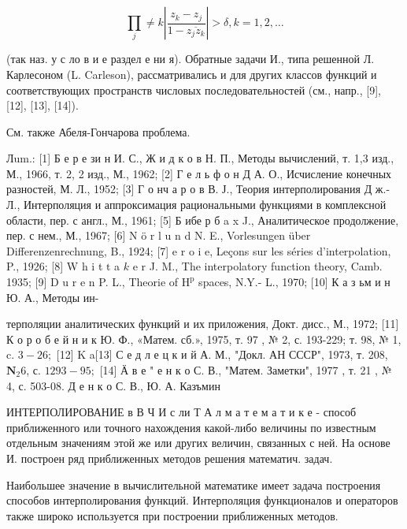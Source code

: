 \documentclass[10pt]{article}
\begin{document}
\[

\prod_{j} \neq k\left|\frac{z_{k}-z_{j}}{1-\overline{z_{j} z_{k}}}\right|>\delta, k=1,2, \ldots

\]



(так наз. у с ло в и е раздел е ни я). Обратные задачи И., типа решенной Л. Карлесоном (L. Carleson), рассматривались и для других классов функций и соответствующих пространств числовых последовательностей (см., напр., [9], [12], [13], [14]).



См. также Абеля-Гончарова проблема.



Лum.: [1] Б е р е зи н И. С., Ж и д к о в Н. П., Методы вычислений, т. 1,3 изд., М., 1966, т. 2, 2 изд., М., 1962; [2] Г е л ь ф о н Д А. О., Исчисление конечных разностей, М. Л., 1952; [3] Г о нч а р о в В. Ј., Теория интерполирования Д ж.-Л., Интерполяция и аппроксимация рациональными функциями в комплексной области, пер. с англ., М., 1961; [5] Б ибе р б a x J., Аналитическое продолжение, пер. с нем., М., 1967; [6] N ö r l u n d N. E., Vorlesungen über Differenzenrechnung, B., 1924; [7] e r o i e, Leçons sur les séries d'interpolation, P., 1926; [8] W $\mathrm{h}$ i t $\mathrm{t}$ a $k$ e r J. M., The interpolatory function theory, Camb. 1935; [9] D u r e n P. L., Theorie of $\mathrm{H}^{\mathrm{p}}$ spaces, N.Y.- L., 1970; [10] К а з ьм и н Ю. А., Методы ин-

терполяции аналитических функций и их приложения, Докт. дисс., М., 1972; [11] К о р о б е й н и к Ю. Ф., «Матем. сб.», 1975, т. 97 , № 2, с. 193-229; т. 98, № 1, c. $3-26 ;$ [12] K a[13] С е д л е ц к и й А. М., "Докл. АН СССР", 1973, т. 208, $\mathbf{N}_{2} 6$, с. $1293-95 ;$ [14] Ӓ в е " е н к о С. В., "Матем. Заметки", 1977 , т. 21 , № 4, с. 503-08. Д е н к о С. В., Ю. А. Казъмин



ИНТЕРПОЛИРОВАНИЕ в В Ч И с ли Т А л м а т е м а т и к е - способ приближенного или точного нахождения какой-либо величины по известным отдельным значениям этой же или других величин, связанных с ней. На основе И. построен ряд приближенных методов решения математич. задач.



Наибольшее значение в вычислительной математике имеет задача построения способов интерполирования функций. Интерполяция функционалов и операторов также широко используется при построении приближенных методов.
\end{document}
